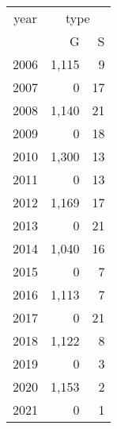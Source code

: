 \footnotesize\begin{tabular}[t]{lrr}
\toprule
\multicolumn{1}{c}{year} & \multicolumn{2}{c}{type} \\
\cmidrule(l{3pt}r{3pt}){1-1} \cmidrule(l{3pt}r{3pt}){2-3}
  & G & S\\
\midrule
2006 & 1,115 & 9\\
2007 & 0 & 17\\
2008 & 1,140 & 21\\
2009 & 0 & 18\\
2010 & 1,300 & 13\\
2011 & 0 & 13\\
2012 & 1,169 & 17\\
2013 & 0 & 21\\
2014 & 1,040 & 16\\
2015 & 0 & 7\\
2016 & 1,113 & 7\\
2017 & 0 & 21\\
2018 & 1,122 & 8\\
2019 & 0 & 3\\
2020 & 1,153 & 2\\
2021 & 0 & 1\\
\bottomrule
\end{tabular}
